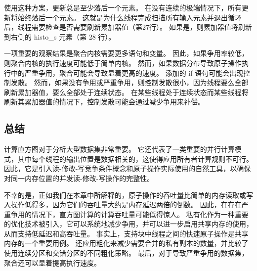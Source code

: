 使用这种方案，更新总是至少落后一个元素。 在没有连续的极端情况下，所有更新将始终落后一个元素。 这就是为什么线程完成扫描所有输入元素并退出循环后，线程需要检查是否需要刷新累加器值（第27行）。 如果是，则累加器值将刷新到右侧的 histo\_s 元素（第 28 行）。

一项重要的观察结果是聚合内核需要更多语句和变量。 因此，如果争用率较低，则聚合内核的执行速度可能低于简单内核。 然而，如果数据分布导致原子操作执行中的严重争用，聚合可能会导致显着更高的速度。 添加的 if 语句可能会出现控制发散。 然而，如果没有争用或严重争用，则控制发散很小，因为线程要么全部刷新累加器值，要么全部处于连续状态。 在某些线程处于连续状态而某些线程将刷新其累加器值的情况下，控制发散可能会通过减少争用来补偿。

\subsection{总结}
计算直方图对于分析大型数据集非常重要。 它还代表了一类重要的并行计算模式，其中每个线程的输出位置是数据相关的，这使得应用所有者计算规则不可行。 因此，它是引入读-修改-写竞争条件概念和原子操作实际使用的自然工具，以确保对同一内存位置的并发读-修改-写操作的完整性。

不幸的是，正如我们在本章中所解释的，原子操作的吞吐量比简单的内存读取或写入操作低得多，因为它们的吞吐量大约是内存延迟两倍的倒数。 因此，在存在严重争用的情况下，直方图计算的计算吞吐量可能低得惊人。 私有化作为一种重要的优化技术被引入，它可以系统地减少争用，并可以进一步启用共享内存的使用，从而支持低延迟和高吞吐量。 事实上，支持块中线程之间的快速原子操作是共享内存的一个重要用例。 还应用粗化来减少需要合并的私有副本的数量，并比较了使用连续分区和交错分区的不同粗化策略。 最后，对于导致严重争用的数据集，聚合还可以显着提高执行速度。
